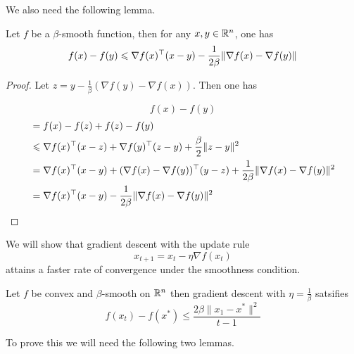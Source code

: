 We also need the following lemma.

\begin{lemma} \label{lm2}
Let $f$ be a $\beta$-smooth function, then for any $x,y \in \mathbb{R}^n$, one has
$$f(x) - f(y)\leqslant \nabla f(x)^\top(x-y) - \frac{1}{2\beta}\|\nabla f(x) - \nabla f(y)\|$$
\end{lemma}

\begin{proof}
Let $z = y - \frac{1}{\beta}(\nabla f(y) - \nabla f(x))$.  Then one has

$$f(x) - f(y)$$
\begin{align}
    &= f(x) - f(z) + f(z) - f(y) \\
    &\leqslant \nabla f(x)^\top(x-z) + \nabla f(y)^\top(z-y) + \frac{\beta}{2}\|z-y\|^2 \\
    &= \nabla f(x)^\top(x-y) + (\nabla f(x) - \nabla f(y))^\top(y-z) + \frac{1}{2\beta}\|\nabla f(x) - \nabla f(y)\|^2 \\
    &= \nabla f(x)^\top(x-y) - \frac{1}{2\beta} \|\nabla f(x) - \nabla f(y)\|^2
\end{align}

\end{proof}


We will show that gradient descent with the update rule
$$x_{t+1} = x_t - \eta \nabla f(x_t)$$
attains a faster rate of convergence under the smoothness condition.

\begin{theorem}
Let $f$ be convex and $\beta$-smooth on $\mathbb{R}^n$ then gradient descent with $\eta = \frac{1}{\beta}$ satsifies
$$f(x_t) - f(x^*) \leq \frac{2\beta\|x_1 - x^*\|^2}{t-1}$$
\end{theorem}
To prove this we will need the following two lemmas.

